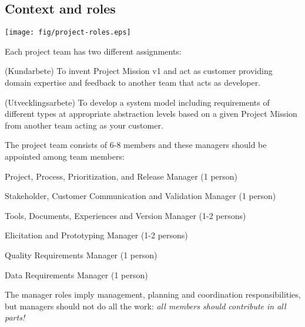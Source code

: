 \documentclass[10pt,a4paper]{article}
\begin{document}
\subsection{Context and roles}
\texttt{[image: fig/project-roles.eps]}
%
\begin{figure}[h]
\centering%
\vskip-1.5cm
\hskip-2.9cm
\vskip0.7cm
\end{figure}

\noindent Each project team has two different assignments:
\begin{description}[noitemsep]
\item[Customer work] (Kundarbete) To invent Project Mission v1 and act as customer providing domain expertise and feedback to another team that acts as developer.
\item[Development work] (Utvecklingsarbete) To develop a system model including requirements of different types at appropriate abstraction levels based on a given Project Mission from another team acting as your customer.
\end{description}

\noindent 
The project team consists of 6-8 members and these managers should be appointed among team members:

\begin{description}[noitemsep]
\item[P3RM] Project, Process, Prioritization, and Release Manager (1 person)
\item[SCCVM] Stakeholder, Customer Communication and Validation Manager (1 person) 
\item[TDEVM] Tools, Documents, Experiences and Version Manager (1-2 persons) 
\item [EPM] Elicitation and Prototyping Manager (1-2 persons) 
\item [QRM] Quality Requirements Manager (1 person)
\item [DRM] Data Requirements Manager (1 person)
\end{description}
The manager roles imply management, planning and coordination responsibilities, but managers should not do all the work: {\it all members should contribute in all parts!} 
\end{document}
